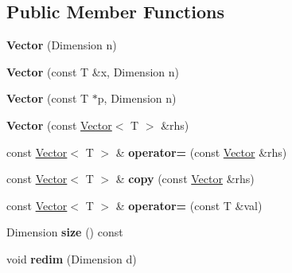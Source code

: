 \subsection*{Public Member Functions}
\begin{DoxyCompactItemize}
\item 
\mbox{\label{classTLAS_1_1Vector_a89a07ccfddfbea1350161b94fe27a426}} 
{\bfseries Vector} (Dimension n)
\item 
\mbox{\label{classTLAS_1_1Vector_adc9ed95f59f281ab26d5dc4389990e78}} 
{\bfseries Vector} (const T \&x, Dimension n)
\item 
\mbox{\label{classTLAS_1_1Vector_af0ba54bddd1df75dfd70c2e3dfa83dc2}} 
{\bfseries Vector} (const T $\ast$p, Dimension n)
\item 
\mbox{\label{classTLAS_1_1Vector_ad3c77eaaa01e17752a69fa68e568aa05}} 
{\bfseries Vector} (const \hyperlink{classTLAS_1_1Vector}{Vector}$<$ T $>$ \&rhs)
\item 
\mbox{\label{classTLAS_1_1Vector_a47a17db1fef9c5b76310d470254461b4}} 
const \hyperlink{classTLAS_1_1Vector}{Vector}$<$ T $>$ \& {\bfseries operator=} (const \hyperlink{classTLAS_1_1Vector}{Vector} \&rhs)
\item 
\mbox{\label{classTLAS_1_1Vector_a1465bd31f4f95904c52caccfdcc0916f}} 
const \hyperlink{classTLAS_1_1Vector}{Vector}$<$ T $>$ \& {\bfseries copy} (const \hyperlink{classTLAS_1_1Vector}{Vector} \&rhs)
\item 
\mbox{\label{classTLAS_1_1Vector_adc03cf197ec8ae79d9b371920e09c795}} 
const \hyperlink{classTLAS_1_1Vector}{Vector}$<$ T $>$ \& {\bfseries operator=} (const T \&val)
\item 
\mbox{\label{classTLAS_1_1Vector_a818f87944338f3403913007330402513}} 
Dimension {\bfseries size} () const
\item 
\mbox{\label{classTLAS_1_1Vector_a1043d428dce104ff2ae33d3eaf1af151}} 
void {\bfseries redim} (Dimension d)
\item 

\end{DoxyCompactItemize}
